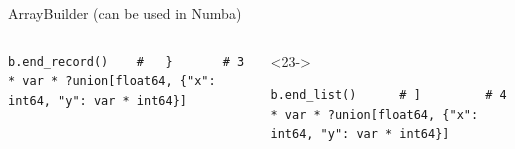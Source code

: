 \documentclass[aspectratio=169]{beamer}
\begin{document}
\begin{frame}[fragile]{ArrayBuilder (can be used in Numba)}
\begin{columns}
\begin{uncoverenv}
\begin{verbatim}
b.end_record()    #   }       # 3 * var * ?union[float64, {"x": int64, "y": var * int64}]
\end{verbatim}
\end{uncoverenv}
\vspace{-0.43 cm}
\begin{uncoverenv}<23->
\begin{verbatim}
b.end_list()      # ]         # 4 * var * ?union[float64, {"x": int64, "y": var * int64}]
\end{verbatim}
\end{uncoverenv}
\end{columns}
\end{frame}


\end{document}
